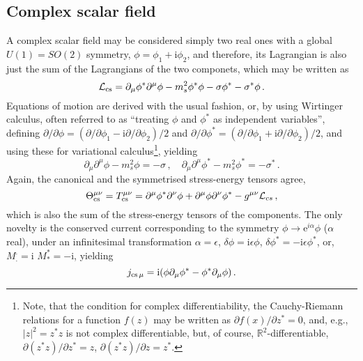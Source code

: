 \documentclass[a4paper,12pt]{article}
\def\e{\mathrm{e}}
\def\imagi{\mathrm{i}}
\def\lag{{\mathcal{L}}}
\begin{document}
\subsection{Complex scalar field}\label{ssec:cscalar}
A complex scalar field may be considered simply two real ones with a global $U(1)=SO(2)$ symmetry, $\phi=\phi_1+\imagi\phi_2$, and therefore, its Lagrangian is also just the sum of the Lagrangians of the two componets, which may be written as
\begin{equation}\label{eq:LagCSc}
 \lag_{\rm cs}=\partial_\mu \phi^* \partial^\mu\phi -m_s^2 \phi^*\phi-\sigma\phi^*-\sigma^*\phi\,.
\end{equation}
Equations of motion are derived with the usual fashion, or, by using Wirtinger calculus, often referred to as ``treating $\phi$ and $\phi^*$ as independent variables'',  defining $\partial/\partial\phi = (\partial/\partial\phi_1 - \imagi\partial/\partial\phi_2)/2$ and $\partial/\partial\phi^* = (\partial/\partial\phi_1 + \imagi\partial/\partial\phi_2)/2$, and using these for variational calculus\footnote{Note, that the condition for complex differentiability, the Cauchy-Riemann relations for a function $f(z)$ may be written as $\partial f(x)/\partial z^*=0$, and, e.g., $|z|^2=z^*z$ is not complex differentiable, but, of course, $\mathbb{R}^2$-differentiable, $\partial (z^*z)/\partial z^*=z$, $\partial (z^*z)/\partial z=z^*$.}, yielding
\begin{equation}\label{eq:cKGe}
 \partial_\mu\partial^\mu \phi -m_s^2\phi=-\sigma\,,\quad
 \partial_\mu\partial^\mu \phi^* -m_s^2\phi^*=-\sigma^*\,.
\end{equation}
Again, the canonical and the symmetrised stress-energy tensors agree,
\begin{equation}\label{eq:EMcanCSc}
 \Theta^{\mu\nu}_{\rm cs} = T^{\mu\nu}_{\rm cs}= \partial^\mu\phi^*\partial^\nu\phi + \partial^\mu\phi\partial^\nu\phi^*-g^{\mu\nu}\lag_{cs}\,,
\end{equation}
which is also the sum of the stress-energy tensors of the components. The only novelty is the conserved current corresponding to the symmetry $\phi\to \e^{i\alpha}\phi$ ($\alpha$ real), under an infinitesimal transformation $\alpha=\epsilon$, $\delta\phi=\imagi\epsilon\phi$, $\delta\phi^*=-\imagi\epsilon\phi^*$, or, $M^._. = \imagi$ $M^*_*=-\imagi$, yielding
\begin{equation}\label{eq:JISCSc}
 j_{{\rm cs}\,\mu} = \imagi(\phi\partial_\mu\phi^* - \phi^*\partial_\mu\phi)\,.
\end{equation}
\end{document}
